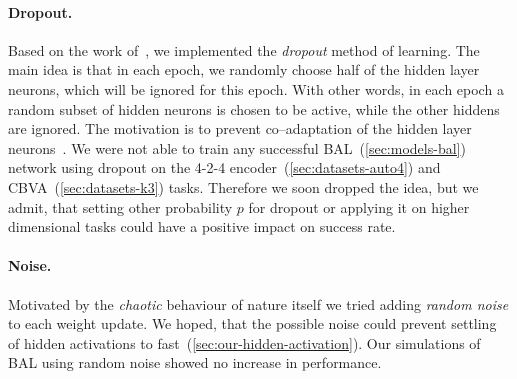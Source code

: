 


\paragraph{Dropout.}
\label{sec:sim-our-dropout}
Based on the work of~\citet{hinton2012improving}, we implemented the \emph{dropout} method of learning. The main idea is that in each epoch, we randomly choose half of the hidden layer neurons, which will be ignored for this epoch. With other words, in each epoch a random subset of hidden neurons is chosen to be active, while the other hiddens are ignored. The motivation is to prevent co--adaptation of the hidden layer neurons~\citep{hinton2012improving}. We were not able to train any successful BAL~(\ref{sec:models-bal}) network using dropout on the 4-2-4 encoder~(\ref{sec:datasets-auto4}) and CBVA~(\ref{sec:datasets-k3}) tasks. Therefore we soon dropped the idea, but we admit, that setting other probability $p$ for dropout or applying it on higher dimensional tasks could have a positive impact on success rate. 

\paragraph{Noise.} 
\label{sec:sim-our-noise} 

Motivated by the \emph{chaotic} behaviour of nature itself we tried adding \emph{random noise} to each weight update. We hoped, that the possible noise could prevent settling of hidden activations to fast~(\ref{sec:our-hidden-activation}). Our simulations of BAL using random noise showed no increase in performance. %

